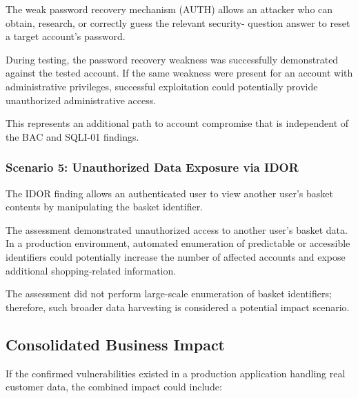 The weak password recovery mechanism (AUTH) allows an attacker who
can obtain, research, or correctly guess the relevant security-
question answer to reset a target account's password.

During testing, the password recovery weakness was successfully
demonstrated against the tested account. If the same weakness were
present for an account with administrative privileges, successful
exploitation could potentially provide unauthorized administrative
access.

This represents an additional path to account compromise that is
independent of the BAC and SQLI-01 findings.

\subsubsection*{Scenario 5: Unauthorized Data Exposure via IDOR}

The IDOR finding allows an authenticated user to view another user's
basket contents by manipulating the basket identifier.

The assessment demonstrated unauthorized access to another user's
basket data. In a production environment, automated enumeration of
predictable or accessible identifiers could potentially increase the
number of affected accounts and expose additional shopping-related
information.

The assessment did not perform large-scale enumeration of basket
identifiers; therefore, such broader data harvesting is considered a
potential impact scenario.

\subsection*{Consolidated Business Impact}

If the confirmed vulnerabilities existed in a production application
handling real customer data, the combined impact could include:

